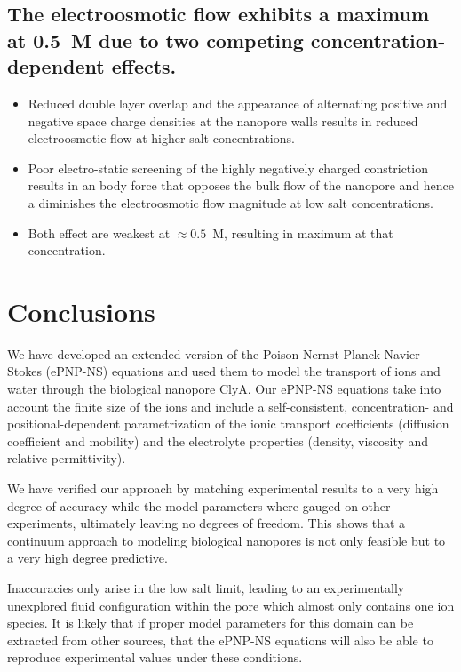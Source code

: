 \documentclass[journal=ancac3,manuscript=article,etalmode=truncate,maxauthors=0,layout=onecolumn]{achemso}
\begin{document}
\subsection{The electroosmotic flow exhibits a maximum at 0.5~M due to two
competing concentration-dependent effects.}

\begin{itemize}
  \item Reduced double layer overlap and the appearance of alternating positive and negative space charge
  densities at the nanopore walls results in reduced electroosmotic flow at higher salt concentrations.
  \item Poor electro-static screening of the highly negatively charged \trans{} constriction
  results in an body force that opposes the bulk flow of the nanopore and hence a diminishes the
  electroosmotic flow magnitude at low salt concentrations.
  \item Both effect are weakest at $\approx0.5$~M, resulting in maximum at that concentration.
\end{itemize}

\section{Conclusions}\label{sec:conclusions}

We have developed an extended version of the Poison-Nernst-Planck-Navier-Stokes
(ePNP-NS) equations and used them to model the transport of ions and water
through the biological nanopore ClyA. Our ePNP-NS equations take into account
the finite size of the ions and include a self-consistent, concentration- and
positional-dependent parametrization of the ionic transport coefficients
(diffusion coefficient and mobility) and the electrolyte properties (density,
viscosity and relative permittivity).

We have verified our approach by matching experimental results to a very high
degree of accuracy while the model parameters where gauged on other experiments,
ultimately leaving no degrees of freedom. This shows that a continuum approach
to modeling biological nanopores is not only feasible but to a very high degree
predictive.

Inaccuracies only arise in the low salt limit, leading to an experimentally
unexplored fluid configuration within the pore which almost only contains one
ion species. It is likely that if proper model parameters for this domain can be
extracted from other sources, that the ePNP-NS equations will also be able to
reproduce experimental values under these conditions.
\end{document}
